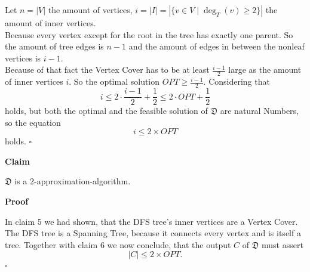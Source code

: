 \documentclass[11pt,a4paper,ngerman]{article}
\newcommand{\claim}{\addtocounter{claims}{1} \bfseries Claim \arabic{claims}}
\newcommand{\proof}{\bfseries Proof}
\begin{document}
\begin{description}
Let $n =|V|$ the amount of vertices, $i = |I| = \left| \{ v \in V \; | \; \deg_T(v) \geq 2 \} \right|$ the amount of inner vertices.\\

Because every vertex except for the root in the tree has exactly one parent. So the amount of tree edges is $n-1$ and the amount of edges in between the nonleaf vertices is $i-1$.\\

Because of that fact the Vertex Cover has to be at least $\frac{i-1}{2}$ large as the amount of inner vertices $i$. So the optimal solution $OPT \geq \frac{i-1}{2}$.
Considering that
$$i \leq 2 \cdot \frac{i - 1}{2} + \frac{1}{2} \leq 2 \cdot OPT + \frac{1}{2}$$ holds, 
but both the optimal and the feasible solution of $\mathfrak{D}$ are natural Numbers, so the equation
$$
i \leq 2 \times OPT
$$
holds.\mbox{} \hfill $\square$

	\item{\claim} $\mathfrak{D}$ is a 2-approximation-algorithm.
	\item{\proof}

In claim 5 we had shown, that the DFS tree's inner vertices are a Vertex Cover. The DFS tree is a Spanning Tree, because it connects every vertex and is itself a tree. Together with claim 6 we now conclude, that the output $C$ of $\mathfrak{D}$ must assert
$$
|C| \leq 2 \times OPT.
$$
\mbox{}\hfill $\square$
\end{description}

\label{LastPage}
\end{document}
